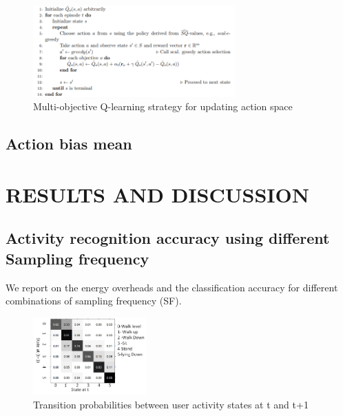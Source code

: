 \documentclass[letterpaper, 10pt, conference]{IEEEtran} %
\begin{document}
  \begin{figure}
    \centering
    \includegraphics[width=0.69\textwidth]{images/Multi-objectiveQ-learning.PNG}
\caption{Multi-objective Q-learning strategy for updating action space}
    \label{fig:moq}
  \end{figure}
  
  \subsection{Action bias mean}
 
\section{RESULTS AND DISCUSSION} \label{sec:results}

 
  
  \subsection{Activity recognition accuracy using different Sampling frequency}
  We report on the energy overheads and the classification accuracy for different combinations of sampling frequency (SF).
  





 

  \begin{figure}
    \centering
    \includegraphics[width=0.39\textwidth]{images/MDP_Confusion.png}

\caption{Transition probabilities between user activity states at t and t+1}
    \label{fig:accuracy}
  \end{figure}
  
\end{document}
